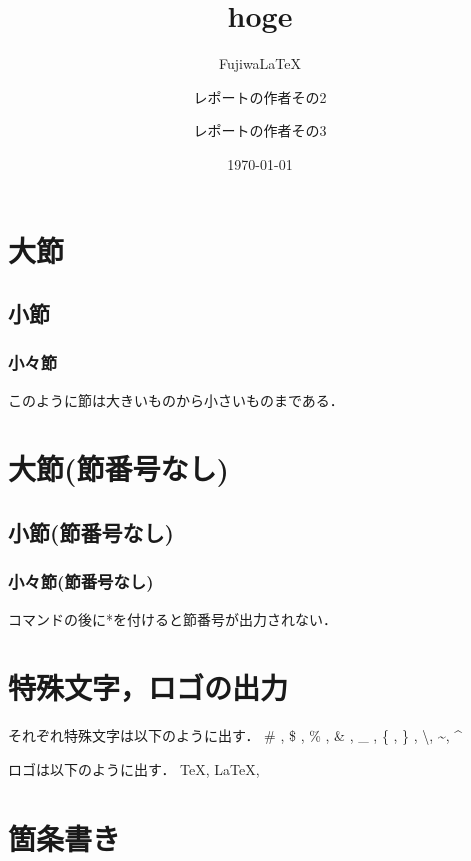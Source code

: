 \documentclass[a4j,titlepage,dvipdfmx,uplatex]{jsarticle}   %
\title{hoge}
\author{FujiwaLaTeX \and
        レポートの作者その2 \and
        レポートの作者その3}
\date{\today} %
\begin{document}
  \maketitle %
  \tableofcontents %
  \clearpage %
  \section{大節}
  \subsection{小節}
  \subsubsection{小々節}
  このように節は大きいものから小さいものまである．

  \section*{大節(節番号なし)}
  \subsection*{小節(節番号なし)}
  \subsubsection*{小々節(節番号なし)}
  コマンドの後に*を付けると節番号が出力されない．
\section{特殊文字，ロゴの出力}
それぞれ特殊文字は以下のように出す．
\# ,
\$ ,
\% ,
\& ,
\_ ,
\{ ,
\} ,
\textbackslash , %
\textasciitilde , %
\textasciicircum %

ロゴは以下のように出す．
\TeX ,
\LaTeX ,
\LaTeXe

  \section{箇条書き}
\end{document}
